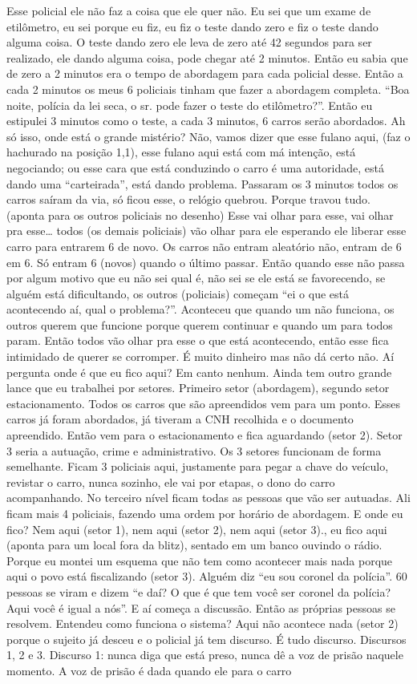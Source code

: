 \documentclass[
	12pt,				%
	openright,			%
	twoside,			%
	a4paper,			%
	chapter=TITLE,		%
	section=TITLE,		%
	subsection=TITLE,	%
	subsubsection=TITLE,%
	spanish,            %
	english,			%
	brazil				%
	]{abntex2}
\begin{document}
\begin{anexosenv}
	Esse policial ele não faz a coisa que ele quer não. Eu sei que um exame de etilômetro, eu sei porque eu fiz, eu fiz o teste dando zero e fiz o teste dando alguma coisa. O teste dando zero ele leva de zero até 42 segundos para ser realizado, ele dando alguma coisa, pode chegar até 2 minutos. Então eu sabia que de zero a 2 minutos era o tempo de abordagem para cada policial desse. Então a cada 2 minutos os meus 6 policiais tinham que fazer a abordagem completa. “Boa noite, polícia da lei seca, o sr. pode fazer o teste do etilômetro?”. Então eu estipulei 3 minutos como o teste, a cada 3 minutos, 6 carros serão abordados. Ah só isso, onde está o grande mistério? Não,  vamos dizer que esse fulano aqui, (faz o hachurado na posição 1,1), esse fulano aqui está com má intenção, está negociando; ou esse cara que está conduzindo o carro é uma autoridade, está dando uma “carteirada”, está dando problema. Passaram os 3 minutos todos os carros saíram da via, só ficou esse, o relógio quebrou. Porque travou tudo. (aponta para os outros policiais no desenho) Esse vai olhar para esse, vai olhar pra esse… todos (os demais policiais) vão olhar para ele esperando ele liberar esse carro para entrarem 6 de novo. Os carros não entram aleatório não, entram de 6 em 6. Só entram 6 (novos) quando o último passar. Então quando esse não passa por algum motivo que eu não sei qual é, não sei se ele está se favorecendo, se alguém está dificultando, os outros (policiais) começam “ei o que está acontecendo aí, qual o problema?”. Aconteceu que quando um não funciona, os outros querem que funcione porque querem continuar e quando um para todos param. Então todos vão olhar pra esse o que está acontecendo, então esse fica intimidado de querer se corromper. É muito dinheiro mas não dá certo não. Aí pergunta onde é que eu fico aqui? Em canto nenhum. Ainda tem outro grande lance que eu trabalhei por setores. Primeiro setor (abordagem), segundo setor estacionamento. Todos os carros que são apreendidos vem para um ponto. Esses carros já foram abordados, já tiveram a CNH recolhida e o documento apreendido. Então vem para o estacionamento e fica aguardando (setor 2). Setor 3 seria a autuação, crime e administrativo.  Os 3 setores funcionam de forma semelhante. Ficam 3 policiais aqui, justamente para pegar a chave do veículo, revistar o carro, nunca sozinho, ele vai por etapas, o dono do carro acompanhando. No terceiro nível ficam todas as pessoas que vão ser autuadas. Ali ficam mais 4 policiais, fazendo uma ordem por horário de abordagem. E onde eu fico? Nem aqui (setor 1), nem aqui (setor 2), nem aqui (setor 3)., eu fico aqui (aponta para um local fora da blitz), sentado em um banco ouvindo o rádio. Porque eu montei um esquema que não tem como acontecer mais nada porque aqui o povo está fiscalizando (setor 3). Alguém diz “eu sou coronel da polícia”. 60 pessoas se viram e dizem “e daí? O que é que tem você ser coronel da polícia? Aqui você é igual a nós”. E aí começa a discussão. Então as próprias pessoas se resolvem. Entendeu como funciona o sistema? Aqui não acontece nada (setor 2) porque o sujeito já desceu e o policial já tem discurso. É tudo discurso. Discursos 1, 2 e 3. Discurso 1: nunca diga que está preso, nunca dê a voz de prisão naquele momento. A voz de prisão é dada quando ele para o carro 
\end{anexosenv}
\end{document}
